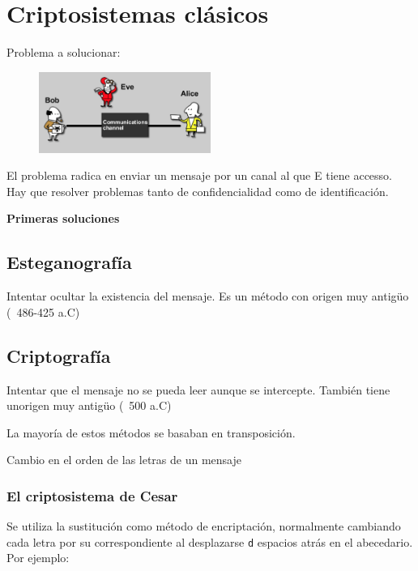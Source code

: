 \chapter{Criptosistemas clásicos}

Problema a solucionar:

\begin{figure}[h]
	\begin{center}
		\includegraphics[width=0.5\textwidth]{img/aliceBobEve.png}
	\end{center}
\end{figure}


El problema radica en enviar un mensaje por un canal al que E tiene accesso. Hay que resolver problemas tanto de confidencialidad como de identificación.

\textbf{Primeras soluciones}

	\section{Esteganografía}

		Intentar ocultar la existencia del mensaje. Es un método con origen muy antigüo (~486-425 a.C)

	\section{Criptografía}

		Intentar que el mensaje no se pueda leer aunque se intercepte. También tiene unorigen muy antigüo (~500 a.C)

		La mayoría de estos métodos se basaban en transposición.

		\begin{defn}[Transposición]
			Cambio en el orden de las letras de un mensaje
		\end{defn}

		\subsection{El criptosistema de Cesar}

			Se utiliza la sustitución como método de encriptación, normalmente cambiando cada letra por su correspondiente al desplazarse \texttt{d} espacios atrás en el abecedario. Por ejemplo:

